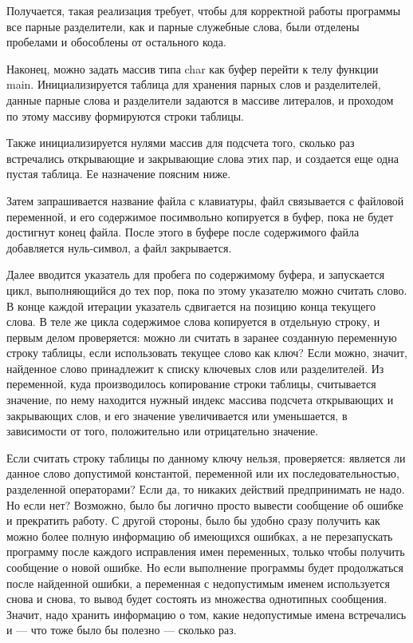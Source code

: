 \documentclass[12pt]{article}
\begin{document}
{	Получается, такая реализация требует, чтобы для корректной работы программы все парные разделители, как и парные служебные слова, были отделены пробелами и обособлены от остального кода.
	
	 
	
	Наконец, можно задать массив типа char как буфер перейти к телу функции main. Инициализируется таблица для хранения парных слов и разделителей, данные парные слова и разделители задаются в массиве литералов, и проходом по этому массиву формируются строки таблицы.
	
	Также инициализируется нулями массив для подсчета того, сколько раз встречались открывающие и закрывающие слова этих пар, и создается еще одна пустая таблица. Ее назначение поясним ниже.
	
	Затем запрашивается название файла с клавиатуры, файл связывается с файловой переменной, и его содержимое посимвольно копируется в буфер, пока не будет достигнут конец файла. После этого в буфере после содержимого файла добавляется нуль-символ, а файл закрывается.
	
	Далее вводится указатель для пробега по содержимому буфера, и запускается цикл, выполняющийся до тех пор, пока по этому указателю можно считать слово. В конце каждой итерации указатель сдвигается на позицию конца текущего слова. В теле же цикла содержимое слова копируется в отдельную строку, и первым делом проверяется: можно ли считать в заранее созданную переменную строку таблицы, если использовать текущее слово как ключ? Если можно, значит, найденное слово принадлежит к списку ключевых слов или разделителей. Из переменной, куда производилось копирование строки таблицы, считывается значение, по нему находится нужный индекс массива подсчета открывающих и закрывающих слов, и его значение увеличивается или уменьшается, в зависимости от того, положительно или отрицательно значение.
	
	Если считать строку таблицы по данному ключу нельзя, проверяется: является ли данное слово допустимой константой, переменной или их последовательностью, разделенной операторами? Если да, то никаких действий предпринимать не надо. Но если нет? Возможно, было бы логично просто вывести сообщение об ошибке и прекратить работу. С другой стороны, было бы удобно сразу получить как можно более полную информацию об имеющихся ошибках, а не перезапускать программу после каждого исправления имен переменных, только чтобы получить сообщение о новой ошибке. Но если выполнение программы будет продолжаться после найденной ошибки, а переменная с недопустимым именем используется снова и снова, то вывод будет состоять из множества однотипных сообщения. Значит, надо хранить информацию о том, какие недопустимые имена встречались и --- что тоже было бы полезно --- сколько раз. 
	
}
\end{document}

